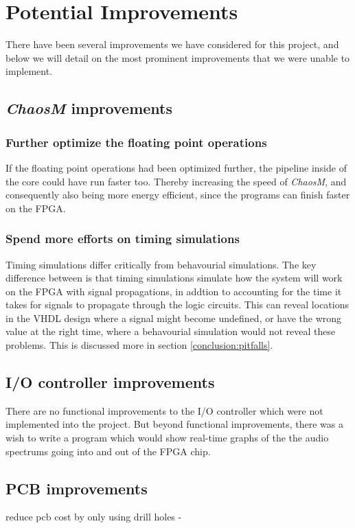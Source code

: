 \section{Potential Improvements}

There have been several improvements we have considered for this project, and
below we will detail on the most prominent improvements that we were unable to
implement.

\subsection{\textit{ChaosM} improvements}
\subsubsection{Further optimize the floating point operations}
If the floating point operations had been optimized further, the pipeline inside of the core could have run faster too.
Thereby increasing the speed of \textit{ChaosM}, and consequently also being more energy efficient, since the programs can finish faster on the FPGA.

\subsubsection{Spend more efforts on timing simulations}
Timing simulations differ critically from behavourial simulations.
The key difference between is that timing simulations simulate how the system will work on the FPGA with signal propagations,
in addtion to accounting for the time it takes for signals to propagate through the logic circuits.
This can reveal locations in the VHDL design where a signal might become undefined, or have the wrong value at the right time, where a behavourial simulation would not reveal these problems.
This is discussed more in section \ref{conclusion:pitfalls}.

\subsection{I/O controller improvements}
There are no functional improvements to the I/O controller which were not implemented into the project.
But beyond functional improvements, there was a wish to write a program which would show
real-time graphs of the the audio spectrums going into and out of the FPGA chip.

\subsection{PCB improvements}
reduce pcb cost by only using drill holes -

